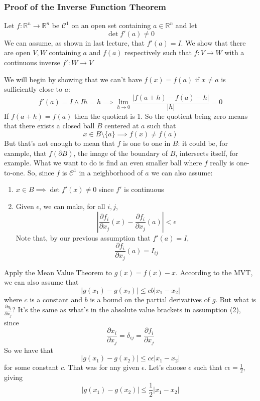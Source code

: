 \documentclass{article}
\newcommand{\reals}[0]{\mathbb{R}}
\newcommand{\mc}[1]{\mathcal{#1}}
\newcommand{\prt}[2]{\frac{\partial #1}{\partial #2}}
\begin{document}
\subsubsection{Proof of the Inverse Function Theorem}

Let \(f: \reals^n \to \reals^n\) be \(\mc{C}^1\) on an open set containing \(a \in \reals^n\) and let \[\det f'(a) \neq 0\]
We can assume, as shown in last lecture, that \(f'(a) = I\).
We show that there are open \(V, W\) containing \(a\) and \(f(a)\) respectively such that \(f: V \to W\) with a continuous inverse \(f': W \to V\)

We will begin by showing that we can't have \(f(x) = f(a)\) if \(x \neq a\) is sufficiently close to \(a\):
\[f'(a) = I \land Ih = h \implies \lim_{h \to 0}\frac{|f(a + h) - f(a) - h|}{|h|} = 0\]
If \(f(a + h) = f(a)\) then the quotient is 1. So the quotient being zero means that there exists a closed ball \(B\) centered at \(a\) such that
\[x \in B \setminus \{a\} \implies f(x) \neq f(a)\]
But that's not enough to mean that \(f\) is one to one in \(B\): it could be, for example, that \(f(\partial B)\), the image of the boundary of \(B\), intersects itself, for example. What we want to do is find an even smaller ball where \(f\) really is one-to-one. So, since \(f\) is \(\mc{C}^1\) in a neighborhood of \(a\) we can also assume:
\begin{enumerate}

  \item \(x \in B \implies \det f'(x) \neq 0\) since \(f'\) is continuous

  \item Given \(\epsilon\), we can make, for all \(i, j\), \[
    \left|\prt{f_i}{x_j}(x) - \prt{f_i}{x_j}(a)\right| < \epsilon
  \]
  Note that, by our previous assumption that \(f'(a) = I\),
  \[\prt{f_i}{x_j}(a) = I_{ij}\]

\end{enumerate}
Apply the Mean Value Theorem to \(g(x) = f(x) - x\). According to the MVT, we can also assume that
\[|g(x_1) - g(x_2)| \leq cb|x_1 - x_2|\]
where \(c\) is a constant and \(b\) is a bound on the partial derivatives of \(g\). But what is \(\prt{g_i}{x_j}\)? It's the same as what's in the absolute value brackets in assumption (2), since
\[\prt{x_i}{x_j} = \delta_{ij} = \prt{f_i}{x_j}\]
So we have that
\[|g(x_1) - g(x_2)| \leq c\epsilon|x_1 - x_2|\]
for some constant \(c\). That was for any given \(\epsilon\). Let's choose \(\epsilon\) such that \(c\epsilon = \frac{1}{2}\), giving
\[|g(x_1) - g(x_2)| \leq \frac{1}{2}|x_1 - x_2|\]
\end{document}
